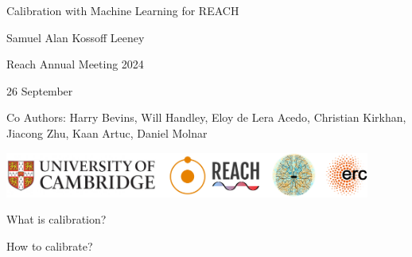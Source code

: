 \documentclass[aspectratio=169]{beamer}
\begin{document}
\begin{frame}
	\begin{center}
		{\LARGE Calibration with Machine Learning for REACH\par}
		\vspace{0.5cm}

		{\large Samuel Alan Kossoff Leeney\par}
		\vspace{0.5cm}

		{\normalsize Reach Annual Meeting 2024\par}

		{\normalsize 26 September \par}
		\vspace{1cm}

		{\footnotesize Co Authors: Harry Bevins, Will Handley, Eloy de Lera Acedo, Christian Kirkhan, Jiacong Zhu, Kaan Artuc, Daniel Molnar\par}
		\vfill

		\includegraphics[width=0.9\textwidth]{affiliations.png}
	\end{center}
\end{frame}

\begin{frame}{\small{What is calibration?}}
	\begin{figure}[h]
		\centering
		
	\end{figure}
	\vfill
\end{frame}

\begin{frame}{\small{How to calibrate?}}
	\begin{figure}[h]
		\centering
		
	\end{figure}
	\vspace{0.7cm}
	\vfill
\end{frame}
\end{document}

